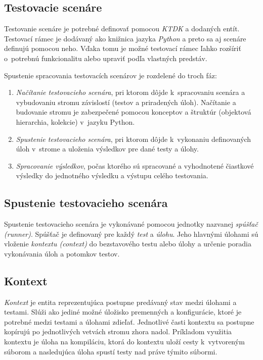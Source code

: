 \documentclass[
  digital, %
  oneside, %
  table,   %
  lof,     %
  lot,   %
]{fithesis3}
\begin{document}
\subsection{Testovacie scenáre}

Testovanie scenáre je potrebné definovať pomocou \emph{KTDK} a dodaných entít. Testovací rámec je dodávaný ako knižnica jazyka \emph{Python} a preto sa aj scenáre definujú pomocou neho. Vďaka tomu je možné testovací rámec ľahko rozšíriť o~potrebnú funkcionalitu alebo upraviť podľa vlastných predstáv. 

Spustenie spracovania testovacích scenárov je rozdelené do troch fáz:
\begin{enumerate}
    \item \emph{Načítanie testovacieho scenára}, pri ktorom dôjde k~spracovaniu scenára a vybudovaniu stromu závislostí (testov a priradených úloh). Načítanie a budovanie stromu je zabezpečené pomocou konceptov a štruktúr (objektová hierarchia, kolekcie) v~jazyku Python.
    \item \emph{Spustenie testovacieho scenára}, pri ktorom dôjde k~vykonaniu definovaných úloh v~strome a uloženia výsledkov pre dané testy a úlohy.
    \item \emph{Spracovanie výsledkov}, počas ktorého sú spracované a vyhodnotené čiastkové výsledky do jednotného výsledku a výstupu celého testovania.
\end{enumerate}

\subsection{Spustenie testovacieho scenára}

Spustenie testovacieho scenára je vykonávané pomocou jednotky nazvanej \emph{spúšťač (runner)}. Spúšťač je definovaný pre každý \emph{test} a \emph{úlohu}. Jeho hlavnými úlohami sú vloženie \emph{kontextu (context)} do bezstavového testu alebo úlohy a určenie poradia vykonávania úloh a potomkov testov. 

\subsection{Kontext}

\emph{Kontext} je entita reprezentujúca postupne predávaný stav medzi úlohami a testami. Slúži ako jediné možné úložisko premenných a konfigurácie, ktoré je potrebné medzi testami a úlohami zdieľať. Jednotlivé časti kontextu sa postupne kopírujú po jednotlivých vetvách stromu zhora nadol. Príkladom využitia kontextu je úloha na kompiláciu, ktorá do kontextu uloží cesty k~vytvoreným súborom a nasledujúca úloha spustí testy nad práve týmito súbormi.
\end{document}
